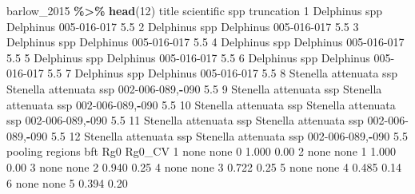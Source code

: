 \documentclass[
]{book}
\newenvironment{Shaded}{\begin{snugshade}}{\end{snugshade}}
\newcommand{\DecValTok}[1]{\textcolor[rgb]{0.00,0.00,0.81}{#1}}
\newcommand{\FloatTok}[1]{\textcolor[rgb]{0.00,0.00,0.81}{#1}}
\newcommand{\FunctionTok}[1]{\textcolor[rgb]{0.13,0.29,0.53}{\textbf{#1}}}
\newcommand{\NormalTok}[1]{#1}
\newcommand{\SpecialCharTok}[1]{\textcolor[rgb]{0.81,0.36,0.00}{\textbf{#1}}}
\begin{document}
\begin{Shaded}
\begin{Highlighting}[]
\NormalTok{barlow\_2015 }\SpecialCharTok{\%\textgreater{}\%} \FunctionTok{head}\NormalTok{(}\DecValTok{12}\NormalTok{)}
\NormalTok{                    title             scientific              spp truncation}
\DecValTok{1}\NormalTok{           Delphinus spp              Delphinus      }\DecValTok{005{-}016{-}017}        \FloatTok{5.5}
\DecValTok{2}\NormalTok{           Delphinus spp              Delphinus      }\DecValTok{005{-}016{-}017}        \FloatTok{5.5}
\DecValTok{3}\NormalTok{           Delphinus spp              Delphinus      }\DecValTok{005{-}016{-}017}        \FloatTok{5.5}
\DecValTok{4}\NormalTok{           Delphinus spp              Delphinus      }\DecValTok{005{-}016{-}017}        \FloatTok{5.5}
\DecValTok{5}\NormalTok{           Delphinus spp              Delphinus      }\DecValTok{005{-}016{-}017}        \FloatTok{5.5}
\DecValTok{6}\NormalTok{           Delphinus spp              Delphinus      }\DecValTok{005{-}016{-}017}        \FloatTok{5.5}
\DecValTok{7}\NormalTok{           Delphinus spp              Delphinus      }\DecValTok{005{-}016{-}017}        \FloatTok{5.5}
\DecValTok{8}\NormalTok{  Stenella attenuata ssp Stenella attenuata ssp }\DecValTok{002{-}006{-}089}\NormalTok{,}\SpecialCharTok{{-}}\DecValTok{090}        \FloatTok{5.5}
\DecValTok{9}\NormalTok{  Stenella attenuata ssp Stenella attenuata ssp }\DecValTok{002{-}006{-}089}\NormalTok{,}\SpecialCharTok{{-}}\DecValTok{090}        \FloatTok{5.5}
\DecValTok{10}\NormalTok{ Stenella attenuata ssp Stenella attenuata ssp }\DecValTok{002{-}006{-}089}\NormalTok{,}\SpecialCharTok{{-}}\DecValTok{090}        \FloatTok{5.5}
\DecValTok{11}\NormalTok{ Stenella attenuata ssp Stenella attenuata ssp }\DecValTok{002{-}006{-}089}\NormalTok{,}\SpecialCharTok{{-}}\DecValTok{090}        \FloatTok{5.5}
\DecValTok{12}\NormalTok{ Stenella attenuata ssp Stenella attenuata ssp }\DecValTok{002{-}006{-}089}\NormalTok{,}\SpecialCharTok{{-}}\DecValTok{090}        \FloatTok{5.5}
\NormalTok{   pooling regions bft   Rg0 Rg0\_CV}
\DecValTok{1}\NormalTok{     none    none   }\DecValTok{0} \FloatTok{1.000}   \FloatTok{0.00}
\DecValTok{2}\NormalTok{     none    none   }\DecValTok{1} \FloatTok{1.000}   \FloatTok{0.00}
\DecValTok{3}\NormalTok{     none    none   }\DecValTok{2} \FloatTok{0.940}   \FloatTok{0.25}
\DecValTok{4}\NormalTok{     none    none   }\DecValTok{3} \FloatTok{0.722}   \FloatTok{0.25}
\DecValTok{5}\NormalTok{     none    none   }\DecValTok{4} \FloatTok{0.485}   \FloatTok{0.14}
\DecValTok{6}\NormalTok{     none    none   }\DecValTok{5} \FloatTok{0.394}   \FloatTok{0.20}

\end{Highlighting}
\end{Shaded}
\end{document}
